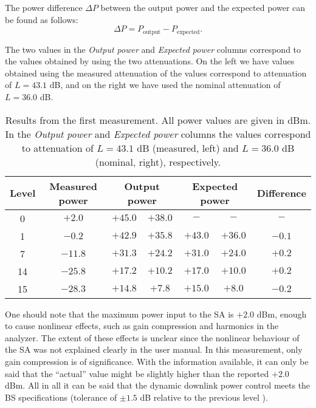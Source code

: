 \documentclass[a4paper, 12pt]{article}
\begin{document}
\noindent The power difference $\Delta P$ between the output power and the expected power can be 
found as follows:
\begin{equation}
	\Delta P = P_\mathrm{output} - P_\mathrm{expected}.
\end{equation}

The two values in the \textit{Output power} and \textit{Expected power} columns correspond 
to the values obtained by using the two attenuations. On the left we have values obtained 
using the measured attenuation of the values correspond to attenuation of $L = 43.1$ dB, 
and on the right we have used the nominal attenuation of $L = 36.0$ dB. 

\begin{table}[!h]
	\begin{center}
	\caption{Results from the first measurement. All power values are given in dBm. 
	In the \textit{Output power} and \textit{Expected power} columns the values correspond to attenuation of 
	$L = 43.1$ dB (measured, left) and $L = 36.0$ dB (nominal, right), respectively.}
	\label{tbl:m1}
	\renewcommand*{\arraystretch}{1.2}
	\begin{tabular}{ccccccc}
	\textbf{Level} & \textbf{Measured power} 	& \multicolumn{2}{c}{\textbf{Output power}}		& \multicolumn{2}{c}{\textbf{Expected power}}		& \textbf{Difference}	\\
	\hline
	0	& $+2.0$ 	& $+45.0$ 	& $+38.0$ 	& $-$ 		& $-$		& $-$ 		\\
	1 	& $-0.2$ 	& $+42.9$ 	& $+35.8$ 	& $+43.0$ 	& $+36.0$ 	& $-0.1$ 	\\
	7	& $-11.8$ 	& $+31.3$ 	& $+24.2$ 	& $+31.0$ 	& $+24.0$ 	& $+0.2$	\\
	14 	& $-25.8$ 	& $+17.2$ 	& $+10.2$ 	& $+17.0$ 	& $+10.0$ 	& $+0.2$	\\
	15	& $-28.3$ 	& $+14.8$ 	& $+7.8$  	& $+15.0$ 	& $+8.0 $ 	& $-0.2$
	\end{tabular}
	\end{center}
	\vspace*{-12pt}
\end{table}

One should note that the maximum power input to the SA is $+2.0$ dBm, enough to 
cause nonlinear effects, such as gain compression and harmonics in the analyzer. 
The extent of these effects is unclear since the nonlinear behaviour of the SA 
was not explained clearly in the user manual. In this measurement, only gain 
compression is of significance. With the information available, it can only be 
said that the ``actual'' value might be slightly higher than the reported $+2.0$ 
dBm. All in all it can be said that the dynamic downlink power control meets the 
BS specifications (tolerance of $\pm 1.5$ dB relative to the previous level \cite{lab1}).
\end{document}
